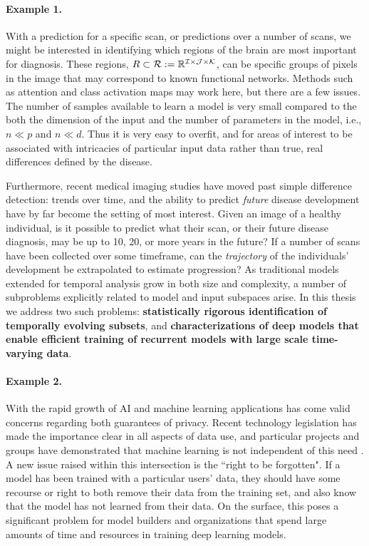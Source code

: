 \paragraph{Example 1.}
With a prediction for a specific scan, or predictions over a number of scans, we might be interested in identifying which regions of the brain are most important for diagnosis. These regions, $R \subset \mathcal{R}:=\mathbb{R}^{\mathcal{I}\times \mathcal{J}\times \mathcal{K}}$, can be specific groups of pixels in the image that may correspond to known functional networks. Methods such as attention and class activation maps may work here, but there are a few issues. The number of samples available to learn a model is very small compared to the both the dimension of the input and the number of parameters in the model, i.e., $n \ll p$ and $n \ll d$. Thus it is very easy to overfit, and for areas of interest to be associated with intricacies of particular input data rather than true, real differences defined by the disease.

Furthermore, recent medical imaging studies have moved past simple difference detection: trends over time, and the ability to predict {\em future} disease development have by far become the setting of most interest.
Given an image of a healthy individual, is it possible to predict what their scan, or their future disease diagnosis, may be up to 10, 20, or more years in the future?
If a number of scans have been collected over some timeframe, can the \textit{trajectory} of the individuals' development be extrapolated to estimate progression?
As traditional models extended for temporal analysis grow in both size and complexity,
a number of subproblems explicitly related to model and input subspaces arise. In this thesis we address two such problems: \textbf{statistically rigorous identification of temporally evolving subsets}, and \textbf{characterizations of deep models that enable efficient training of recurrent models with large scale time-varying data}.
    
\paragraph{Example 2.}
With the rapid growth of AI and machine learning applications has come valid concerns regarding both guarantees of privacy.
Recent technology legislation has made the importance clear in all aspects of data use,
and particular projects and groups have demonstrated that machine learning is not independent of
this need \citep{Exposing}.
A new issue raised within this intersection is the ``right to be forgotten".
If a model has been trained with a particular users' data, 
they should have some recourse or right
to both remove their data from the training set,
and also know that the model has not learned from their data.
On the surface, this poses a significant problem for model builders
and organizations that spend large amounts
of time and resources in 
training deep learning models.

